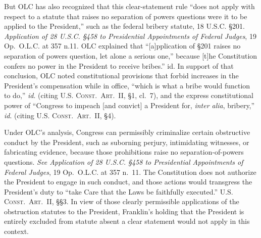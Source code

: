 But OLC has also recognized that this clear-statement rule “does not apply with respect to a statute that raises no separation of powers questions were it to be applied to the President,” such as the federal bribery statute, 18 U.S.C. \S 201.
\textit{Application of 28 U.S.C. \S 458 to Presidential Appointments of Federal Judges}, 19 Op.\ O.L.C. at 357 n.11. OLC explained that “[a]pplication of \S 201 raises no separation of powers question, let alone a serious one,” because [t]he Constitution confers no power in the President to receive bribes.” id.
In support of that conclusion, OLC noted constitutional provisions that forbid increases in the President’s compensation while in office, “which is what a bribe would function to do,” \textit{id}. (citing \textsc{U.S. Const.\ Art.~II}, \S 1, cl.~7), and the express constitutional power of “Congress to impeach [and convict] a President for, \textit{inter alia}, bribery,” \textit{id}. (citing \textsc{U.S. Const.\ Art.~II}, \S 4).

Under OLC’s analysis, Congress can permissibly criminalize certain obstructive conduct by the President, such as suborning perjury, intimidating witnesses, or fabricating evidence, because those prohibitions raise no separation-of-powers questions.
\textit{See Application of 28 U.S.C. \S 458 to Presidential Appointments of Federal Judges}, 19 Op.\ O.L.C. at 357 n.~11.
The Constitution does not authorize the President to engage in such conduct, and those actions would transgress the President’s duty to “take Care that the Laws be faithfully executed.”
\textsc{U.S. Const.\ Art.~II}, \S\S 3.
In view of those clearly permissible applications of the obstruction statutes to the President, Franklin’s holding that the President is entirely excluded from statute absent a clear statement would not apply in this context.

